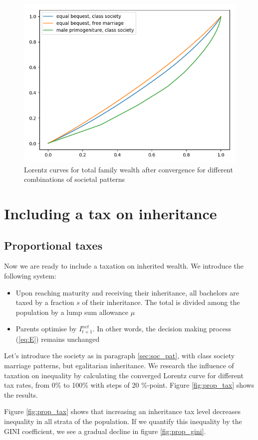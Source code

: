 \begin{figure}
    \centering
    \includegraphics[width=0.8\linewidth{}]{Results/images/compare_rules.png}
    \caption{Lorentz curves for total family wealth after convergence for different combinations of societal patterns  }
    \label{fig:compare_gens}
\end{figure}

\section{Including a tax on inheritance}
\subsection{Proportional taxes}
Now we are ready to include a taxation on inherited wealth. We introduce the following system:
\begin{itemize}
    \item Upon reaching maturity and receiving their inheritance, all bachelors are taxed by a fraction $s$ of their inheritance. The total is divided among the population by a lump sum allowance $\mu$
    \item Parents optimise by $I_{t+1}^{net}$. In other words, the decision making process (\ref{eq:E}) remains unchanged
\end{itemize}

Let's introduce the society as in paragraph \ref{sec:soc_pat}, with class society marriage patterns, but egalitarian inheritance. We research the influence of taxation on inequality by calculating the converged Lorentz curve for different tax rates, from 0\% to 100\% with steps of 20 \%-point. Figure \ref{fig:prop_tax} shows the results.

Figure \ref{fig:prop_tax} shows that increasing an inheritance tax level decreases inequality in all strata of the population. If we quantify this inequality by the GINI coefficient, we see a gradual decline in figure \ref{fig:prop_gini}.

